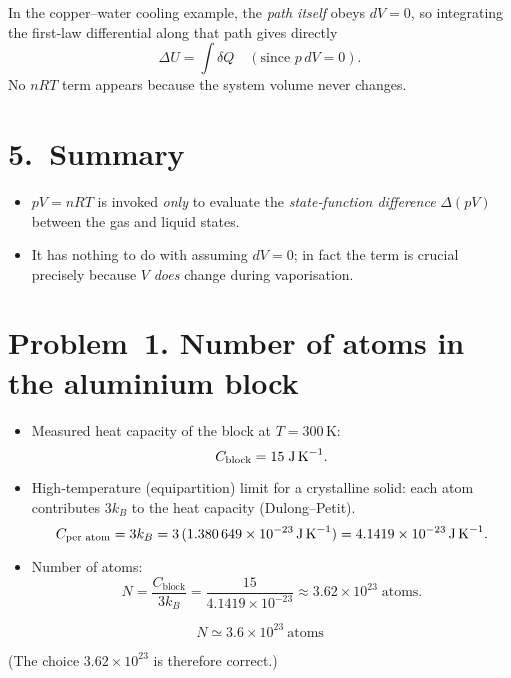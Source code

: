 \documentclass[12pt]{article}
\theoremstyle{definition} %
\theoremstyle{plain} %
\begin{document}
In the copper–water cooling example,
the \emph{path itself} obeys $dV = 0$, so integrating the
first‑law differential along that path gives directly
\[
\Delta U = \int \delta Q \quad (\text{since } p\,dV = 0).
\]
No $nRT$ term appears because the system volume never changes.

\bigskip
\section*{5.\ Summary}

\begin{itemize}
  \item $pV = nRT$ is invoked \emph{only} to evaluate the
        \emph{state‑function difference} $\Delta(pV)$ between the gas
        and liquid states.
  \item It has nothing to do with assuming $dV = 0$; in fact the term
        is crucial precisely because $V$ \emph{does} change during
        vaporisation.
\end{itemize}

\section*{Problem 1.  Number of atoms in the aluminium block}

\begin{itemize}
\item Measured heat capacity of the block at $T=300\,$K:
      \[
      C_{\text{block}} = 15\;\text{J\,K}^{-1}.
      \]
\item High‑temperature (equipartition) limit for a crystalline solid:  
      each atom contributes $3k_B$ to the heat capacity (Dulong–Petit).
\[
C_{\text{per atom}} = 3k_B
                    = 3\,(1.380\,649\times10^{-23}\,\text{J\,K}^{-1})
                    = 4.1419\times10^{-23}\,\text{J\,K}^{-1}.
\]
\item Number of atoms:
\[
N = \frac{C_{\text{block}}}{3k_B}
    = \frac{15}{4.1419\times10^{-23}}
    \approx 3.62\times10^{23}\;\text{atoms}.
\]
\end{itemize}

\[
\boxed{N \simeq 3.6\times10^{23}\ \text{atoms}}
\]

(The choice $3.62\times10^{23}$ is therefore correct.)

\end{document}

